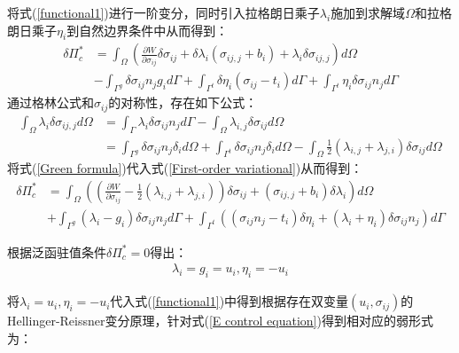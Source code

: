 将式(\ref{functional1})进行一阶变分，同时引入拉格朗日乘子$\lambda_i$施加到求解域$\Omega$和拉格朗日乘子$\eta_i$到自然边界条件中从而得到：
\begin{equation}\label{First-order variational}
\begin{split}
    \delta\Pi_c^*&=\int_{\Omega}(\frac{\partial W}{\partial\sigma_{ij}}\delta\sigma_{ij}+\delta\lambda_i(\sigma_{ij,j}+b_i)+\lambda_i\delta\sigma_{ij,j})d\Omega\\
&-\int_{\Gamma^g}\delta\sigma_{ij}n_jg_id\Gamma+\int_{\Gamma^t}\delta\eta_i(\sigma_{ij}-t_i)d\Gamma+\int_{\Gamma^t}\eta_i\delta\sigma_{ij}n_jd\Gamma
\end{split}
\end{equation}
通过格林公式和$\sigma_{ij}$的对称性，存在如下公式：
\begin{equation}\label{Green formula}
\begin{split}
    \int_{\Omega}\lambda_i\delta\sigma_{ij,j}d\Omega&=\int_{\Gamma}\lambda_i\delta\sigma_{ij}n_jd\Gamma-\int_{\Omega}\lambda_{i,j}\delta\sigma_{ij}d\Omega\\
&=\int_{\Gamma^g}\delta\sigma_{ij}n_j\delta_id\Omega+\int_{\Gamma^t}\delta\sigma_{ij}n_j\delta_id\Omega-\int_{\Omega}\frac{1}{2}(\lambda_{i,j}+\lambda_{j,i})\delta\sigma_{ij}d\Omega
\end{split}
\end{equation}
将式(\ref{Green formula})代入式(\ref{First-order variational})从而得到：
\begin{equation}
\begin{split}
    \delta\Pi_c^*&=\int_{\Omega}((\frac{\partial W}{\partial\sigma_{ij}}-\frac{1}{2}(\lambda_{i,j}+\lambda_{j,i}))\delta\sigma_{ij}+(\sigma_{ij,j}+b_i)\delta\lambda_i)d\Omega\\
    &+\int_{\Gamma^g}(\lambda_i-g_i)\delta\sigma_{ij}n_jd\Gamma+\int_{\Gamma^t}((\sigma_{ij}n_j-t_i)\delta\eta_i+(\lambda_i+\eta_i)\delta\sigma_{ij}n_j)d\Gamma
\end{split}
\end{equation}\par
根据泛函驻值条件$\delta\Pi_c^*=0$得出：
\begin{equation}
\begin{split}
    \lambda_i=g_i=u_i,\eta_i=-u_i
\end{split}
\end{equation}\par
将$\lambda_i=u_i,\eta_i=-u_i$代入式(\ref{functional1})中得到根据存在双变量$(u_i,\sigma_{ij})$的Hellinger-Reissner变分原理，针对式(\ref{E control equation})得到相对应的弱形式为：
